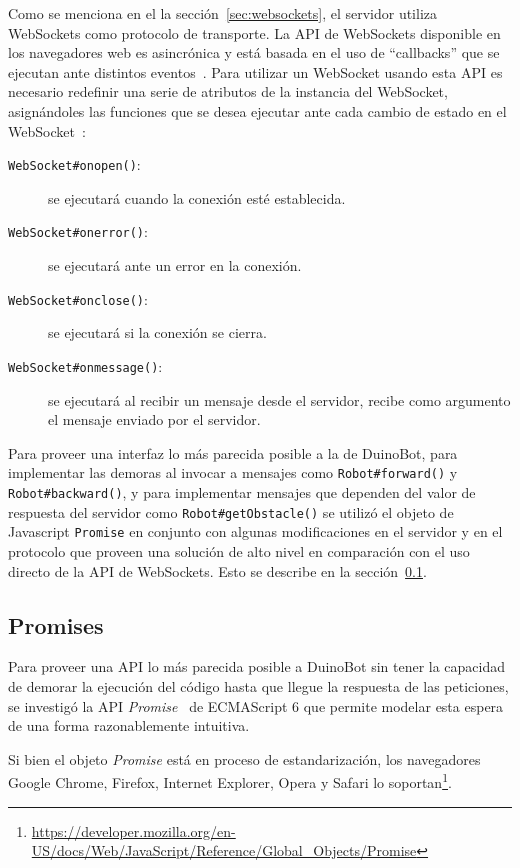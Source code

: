 Como se menciona en el la sección~\ref{sec:websockets}, el servidor
utiliza WebSockets como protocolo de transporte.
La API de WebSockets disponible en los navegadores web es asincrónica y
está basada en el uso de ``callbacks''
que se ejecutan ante distintos eventos~\citep{wang_2013}.
Para utilizar un WebSocket usando esta API es necesario
redefinir una serie de atributos de la instancia del WebSocket,
asignándoles las funciones que se
desea ejecutar ante cada cambio de estado en el
WebSocket~\citep{websocket_2014}:
\begin{description}
    \item[\texttt{WebSocket\#onopen()}:] se ejecutará cuando
    la conexión esté establecida.
    \item[\texttt{WebSocket\#onerror()}:] se ejecutará ante un error en
    la conexión.
    \item[\texttt{WebSocket\#onclose()}:] se ejecutará si la conexión
    se cierra.
    \item[\texttt{WebSocket\#onmessage()}:] se ejecutará al recibir un
    mensaje desde el servidor, recibe como argumento el mensaje
    enviado por el servidor.
\end{description}

Para proveer una interfaz lo más parecida posible a la de DuinoBot,
para implementar
las demoras al invocar a mensajes como \texttt{Robot\#forward()} y
\texttt{Robot\#backward()}, y para implementar mensajes que dependen
del valor de respuesta del servidor como \texttt{Robot\#getObstacle()}
se utilizó el objeto de Javascript \texttt{Promise} en conjunto con
algunas modificaciones en el servidor y en el protocolo que proveen
una solución de alto nivel en comparación con el uso directo de
la API de WebSockets. Esto se describe en la sección~\ref{sec:promises}.

\subsection{Promises}\label{sec:promises}

Para proveer una API lo más parecida posible a DuinoBot sin
tener la capacidad de demorar la ejecución del código hasta que
llegue la respuesta de las peticiones, se investigó la API
\textit{Promise}~\citep{ECMA-262} de ECMAScript 6 que permite modelar
esta espera de una forma razonablemente intuitiva.

Si bien el objeto \textit{Promise} está en proceso de estandarización,
los navegadores Google Chrome, Firefox, Internet Explorer, Opera y Safari lo
soportan\footnote{\url{https://developer.mozilla.org/en-US/docs/Web/JavaScript/Reference/Global_Objects/Promise}}.

